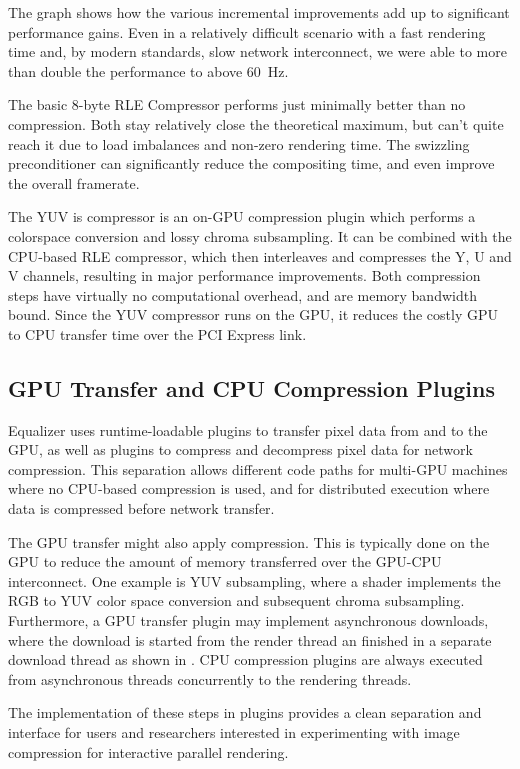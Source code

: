 The graph shows how the various incremental improvements add up to significant performance gains. Even in a relatively difficult scenario with a fast rendering time and, by modern standards, slow network interconnect, we were able to more than double the performance to above 60~Hz.

The basic 8-byte RLE Compressor performs just minimally better than no compression. Both stay relatively close the theoretical maximum, but can't quite reach it due to load imbalances and non-zero rendering time. The swizzling preconditioner can significantly reduce the compositing time, and even improve the overall framerate.

The YUV is compressor is an on-GPU compression plugin which performs a
colorspace conversion and lossy chroma subsampling. It can be combined with the
CPU-based RLE compressor, which then interleaves and compresses the Y, U and V
channels, resulting in major performance improvements. Both compression steps
have virtually no computational overhead, and are memory bandwidth bound. Since
the YUV compressor runs on the GPU, it reduces the costly GPU to CPU transfer
time over the PCI Express link.

\subsection{GPU Transfer and CPU Compression Plugins}

Equalizer uses runtime-loadable plugins to transfer pixel data from and to the
GPU, as well as plugins to compress and decompress pixel data for network
compression. This separation allows different code paths for multi-GPU machines
where no CPU-based compression is used, and for distributed execution where data
is compressed before network transfer.

The GPU transfer might also apply compression. This is typically done on the
GPU to reduce the amount of memory transferred over the GPU-CPU interconnect.
One example is YUV subsampling, where a shader implements the RGB to YUV color
space conversion and subsequent chroma subsampling. Furthermore, a GPU transfer
plugin may implement asynchronous downloads, where the download is started
from the render thread an finished in a separate download thread as shown in
. CPU compression plugins are always executed from asynchronous
threads concurrently to the rendering threads.

The implementation of these steps in plugins provides a clean separation and
interface for users and researchers interested in experimenting with image
compression for interactive parallel rendering.

